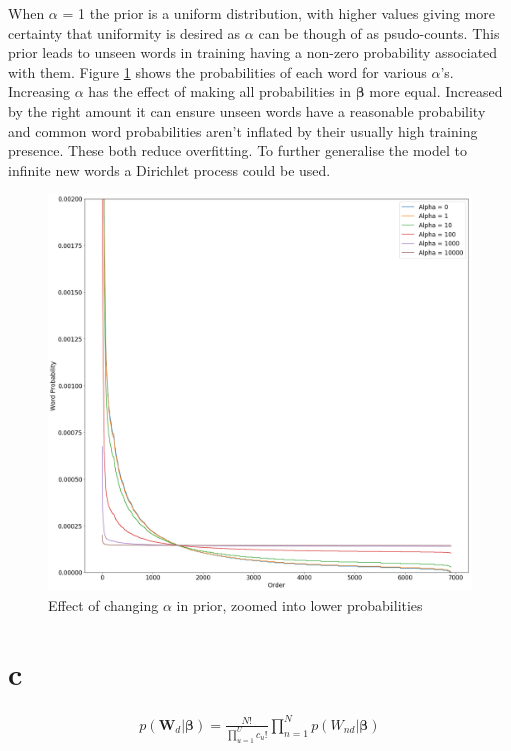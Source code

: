 \documentclass[twoside,twocolumn]{article}
\begin{document}
When $\alpha$ = 1 the prior is a uniform distribution, with higher values giving more certainty that uniformity is desired as $\alpha$ can be though of as psudo-counts. This prior leads to unseen words in training having a non-zero probability associated with them. Figure \ref{fig:b_1} shows the probabilities of each word for various $\alpha$'s. Increasing $\alpha$ has the effect of making all probabilities in $\boldsymbol{\beta}$ more equal. Increased by the right amount it can ensure unseen words have a reasonable probability and common word probabilities aren't inflated by their usually high training presence. These both reduce overfitting. To further generalise the model to infinite new words a Dirichlet process could be used.

\begin{figure}[h]
  \centering
    \includegraphics[width=\linewidth]{b_1}
  \caption{Effect of changing $\alpha$ in prior, zoomed into lower probabilities}
  \label{fig:b_1}
\end{figure}

\section{c}

\begin{equation}
\begin{split}
p(\textbf{W}_{d}|\boldsymbol{\beta})=\frac{N!}{\prod_{u=1}^Uc_u!} \prod_{n=1}^N  p(W_{nd}|\boldsymbol{\beta})
\end{split}
\label{eq:dir3}
\end{equation}
\end{document}
